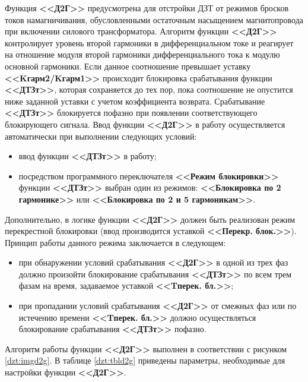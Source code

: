 \begin{flushleft}
\color{black}
\nopagebreak
\end{flushleft}

\par
Функция \textbf{<<Д2Г>>} предусмотрена для отстройки ДЗТ от режимов бросков токов намагничивания, обусловленными остаточным насыщением магнитопровода при включении силового трансформатора. Алгоритм функции \textbf{<<Д2Г>>} контролирует уровень второй гармоники в дифференциальном токе и реагирует на отношение модуля второй гармоники дифференциального тока к модулю основной гармоники. Если данное соотношение превышает уставку \textbf{<<Kгарм2/Kгарм1>>} происходит блокировка срабатывания функции \textbf{<<ДТЗт>>}, которая сохраняется до тех пор, пока соотношение не опустится ниже заданной уставки с учетом коэффициента возврата. Срабатывание \textbf{<<ДТЗт>>} блокируется пофазно при появлении соответствующего блокирующего сигнала. Ввод функции \textbf{<<Д2Г>>} в работу осуществляется автоматически при выполнении следующих условий:
\begin{itemize}
\item ввод функции \textbf{<<ДТЗт>>} в работу; 
\item\sloppy посредством программного переключателя \textbf{<<Режим блокировки>>} функции \textbf{<<ДТЗт>>} выбран один из режимов: \textbf{<<Блокировка по 2 гармонике>>} или \textbf{<<Блокировка по 2 и 5 гармоникам>>}.
\end{itemize}
\par
Дополнительно, в логике функции \textbf{<<Д2Г>>} должен быть реализован режим перекрестной блокировки (ввод производится уставкой \textbf{<<Перекр. блок.>>}). Принцип работы данного режима заключается в следующем:
\begin{itemize}
\item при обнаружении условий срабатывания \textbf{<<Д2Г>>} в одной из трех фаз должно произойти блокирование срабатывания \textbf{<<ДТЗт>>} по всем трем фазам на время, задаваемое уставкой \textbf{<<Tперек. бл.>>};
\item при пропадании условий срабатывания \textbf{<<Д2Г>>} от смежных фаз или по истечению времени \textbf{<<Tперек. бл.>>} должно осуществляться блокирование срабатывания \textbf{<<ДТЗт>>} пофазно.
\end{itemize}
\par
Алгоритм работы функции \textbf{<<Д2Г>>} выполнен в соответствии с рисунком \ref{dzt:imgd2g}. В таблице \ref{dzt:tbld2g} приведены параметры, необходимые для настройки функции \textbf{<<Д2Г>>}. 

